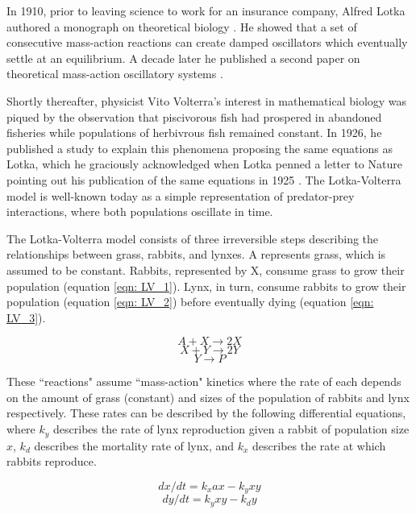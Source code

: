 \documentclass[12pt]{report}
\begin{document}
In 1910, prior to leaving science to work for an insurance company, Alfred Lotka authored a monograph on theoretical biology \cite{Lotka1910}. He showed that a set of consecutive mass-action reactions can create damped oscillators which eventually settle at an equilibrium. A decade later he published a second paper on theoretical mass-action oscillatory systems \cite{Lotka1920, Lotka1920b}.

Shortly thereafter, physicist Vito Volterra's interest in mathematical biology was piqued by the observation that piscivorous fish had prospered in abandoned fisheries while populations of herbivrous fish remained constant. In 1926, he published a study to explain this phenomena proposing the same equations as Lotka, which he graciously acknowledged when Lotka penned a letter to Nature pointing out his publication of the same equations in 1925 \cite{Volterra, lotka-volterra}. The Lotka-Volterra model is well-known today as a simple representation of predator-prey interactions, where both populations oscillate in time. 

The Lotka-Volterra model consists of three irreversible steps describing the relationships between grass, rabbits, and lynxes. A represents grass, which is assumed to be constant. Rabbits, represented by X, consume grass to grow their population (equation \ref{eqn: LV_1}). Lynx, in turn, consume rabbits to grow their population (equation \ref{eqn: LV_2}) before eventually dying (equation \ref{eqn: LV_3}).

\begin{equation}
\label{eqn: LV_1}
A + X \to 2X
\end{equation}
\begin{equation}
\label{eqn: LV_2}
X + Y \to 2Y
\end{equation}
\begin{equation}
\label{eqn: LV_3}
Y \to P
\end{equation}

These ``reactions" assume ``mass-action" kinetics where the rate of each depends on the amount of grass (constant) and sizes of the population of rabbits and lynx respectively. These rates can be described by the following differential equations, where ${k_{y}}$ describes the rate of lynx reproduction given a rabbit of population size ${x}$, ${k_{d}}$ describes the mortality rate of lynx, and ${k_{x}}$ describes the rate at which rabbits reproduce. 

\begin{equation}
dx/dt = k_{x}ax - k_{y}xy
\end{equation}
\begin{equation}
dy/dt = k_{y}xy - k_{d}y
\end{equation}
\end{document}
